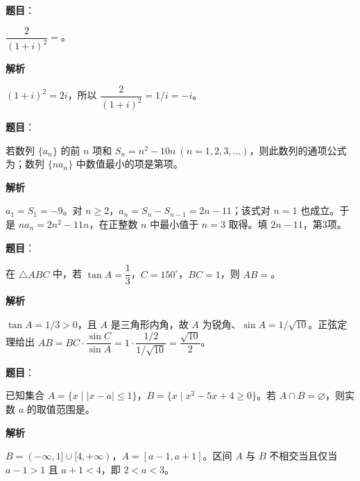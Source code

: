\begin{answer}

\textbf{题目}：

$\dfrac{2}{(1+i)^2}=$\gkblank{}。

\textbf{解析}

$(1+i)^2=2i$，所以 $\dfrac2{(1+i)^2}=1/i=-i$。


\end{answer}
\begin{answer}

\textbf{题目}：

若数列 $\{a_n\}$ 的前 $n$ 项和 $S_n=n^2-10n\ (n=1,2,3,\ldots)$，则此数列的通项公式为\gkblank{}；数列 $\{na_n\}$ 中数值最小的项是第\gkblank{}项。

\textbf{解析}

$a_1=S_1=-9$。对 $n\ge2$，$a_n=S_n-S_{n-1}=2n-11$；该式对 $n=1$ 也成立。于是 $na_n=2n^2-11n$，在正整数 $n$ 中最小值于 $n=3$ 取得。填 $2n-11$，第3项。


\end{answer}
\begin{answer}

\textbf{题目}：

在 $\triangle ABC$ 中，若 $\tan A=\dfrac13$，$C=150^\circ$，$BC=1$，则 $AB=$\gkblank{}。

\textbf{解析}

$\tan A=1/3>0$，且 $A$ 是三角形内角，故 $A$ 为锐角、$\sin A=1/\sqrt{10}$。正弦定理给出
$AB=BC\cdot\dfrac{\sin C}{\sin A}=1\cdot\dfrac{1/2}{1/\sqrt{10}}=\dfrac{\sqrt{10}}2$。


\end{answer}
\begin{answer}

\textbf{题目}：

已知集合 $A=\{x\mid |x-a|\leq 1\}$，$B=\{x\mid x^2-5x+4\geq 0\}$。若 $A\cap B=\varnothing$，则实数 $a$ 的取值范围是\gkblank{}。

\textbf{解析}

$B=(-\infty,1]\cup[4,+\infty)$，$A=[a-1,a+1]$。区间 $A$ 与 $B$ 不相交当且仅当 $a-1>1$ 且 $a+1<4$，即 $2<a<3$。


\end{answer}
